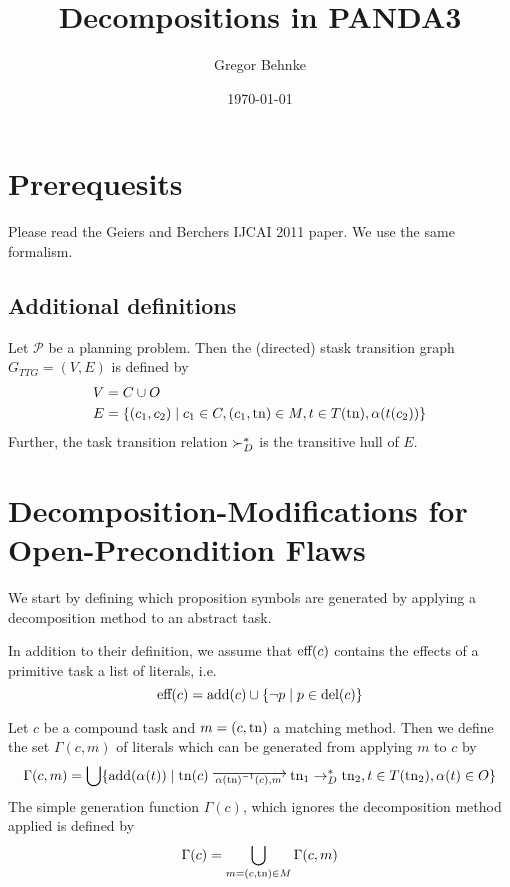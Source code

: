 \documentclass{scrartcl}
\title{Decompositions in PANDA3}
\author{Gregor Behnke}
\date{\today}
\begin{document}
\maketitle



\section{Prerequesits}
Please read the Geiers and Berchers IJCAI 2011 paper.
We use the same formalism.

\subsection{Additional definitions}
\begin{definition}
Let $\mathcal P$ be a planning problem.
Then the (directed) stask transition graph $G_{TTG} = (V,E)$ is defined by
\begin{align*}
    V &= C \cup O\\
    E &= \{(c_1,c_2) \mid c_1 \in C, (c_1,\mathrm{tn}) \in M, t \in T(\mathrm{tn}), \alpha(t(c_2))\}
\end{align*}
Further, the task transition relation $\succ_D^*$ is the transitive hull of $E$.
\end{definition}


\section{Decomposition-Modifications for Open-Precondition Flaws}
We start by defining which proposition symbols are generated by applying a decomposition method to an abstract task.

In addition to their definition, we assume that $\text{eff}(c)$ contains the effects of a primitive task a list of literals, i.e.
\[\text{eff}(c) = \text{add}(c) \cup \{\neg p \mid p \in \text{del}(c)\}\]

\begin{definition}
Let $c$ be a compound task and $m = (c,\mathrm{tn})$ a matching method.
Then we define the set $\Gamma(c,m)$ of literals which can be generated from applying $m$ to $c$ by
\[
\Gamma(c,m) = \bigcup \{ \Add( \alpha(t)) \mid \tn(c) \decompose{\alpha(\tn)^{-1}(c)}{m} \tn_1 \leqd \tn_2, t \in T(\tn_2), \alpha(t) \in O\}
\]
The simple generation function $\Gamma(c)$, which ignores the decomposition method applied is defined by
\[
\Gamma(c) = \bigcup_{m=(c,\mathrm{tn})\in M} \Gamma(c,m)
\]
\end{definition}
\end{document}
